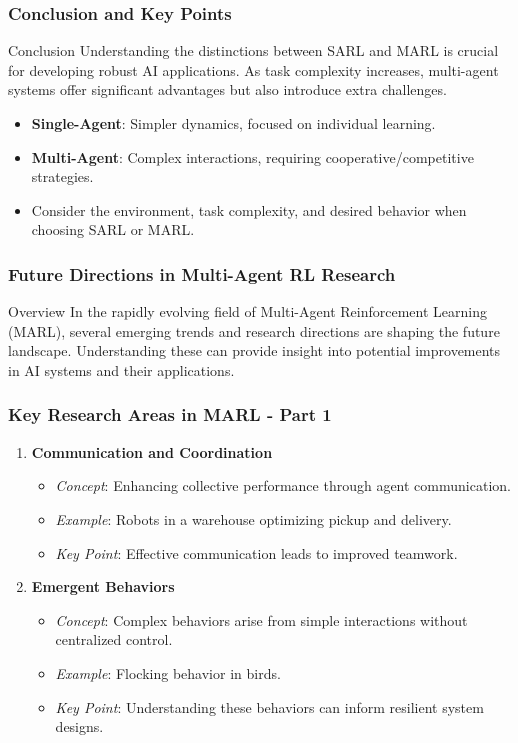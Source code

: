 \documentclass[aspectratio=169]{beamer}
\begin{document}
\begin{frame}[fragile]
    \frametitle{Conclusion and Key Points}
    \begin{block}{Conclusion}
        Understanding the distinctions between SARL and MARL is crucial for developing robust AI applications. As task complexity increases, multi-agent systems offer significant advantages but also introduce extra challenges.
    \end{block}

    \begin{itemize}
        \item \textbf{Single-Agent}: Simpler dynamics, focused on individual learning.
        \item \textbf{Multi-Agent}: Complex interactions, requiring cooperative/competitive strategies.
        \item Consider the environment, task complexity, and desired behavior when choosing SARL or MARL.
    \end{itemize}
\end{frame}

\begin{frame}[fragile]
  \frametitle{Future Directions in Multi-Agent RL Research}
  \begin{block}{Overview}
    In the rapidly evolving field of Multi-Agent Reinforcement Learning (MARL), several emerging trends and research directions are shaping the future landscape. Understanding these can provide insight into potential improvements in AI systems and their applications.
  \end{block}
\end{frame}

\begin{frame}[fragile]
  \frametitle{Key Research Areas in MARL - Part 1}
  \begin{enumerate}
    \item \textbf{Communication and Coordination}
      \begin{itemize}
        \item \textit{Concept}: Enhancing collective performance through agent communication.
        \item \textit{Example}: Robots in a warehouse optimizing pickup and delivery.
        \item \textit{Key Point}: Effective communication leads to improved teamwork.
      \end{itemize}
    
    \item \textbf{Emergent Behaviors}
      \begin{itemize}
        \item \textit{Concept}: Complex behaviors arise from simple interactions without centralized control.
        \item \textit{Example}: Flocking behavior in birds.
        \item \textit{Key Point}: Understanding these behaviors can inform resilient system designs.
      \end{itemize}
  \end{enumerate}
\end{frame}
\end{document}
